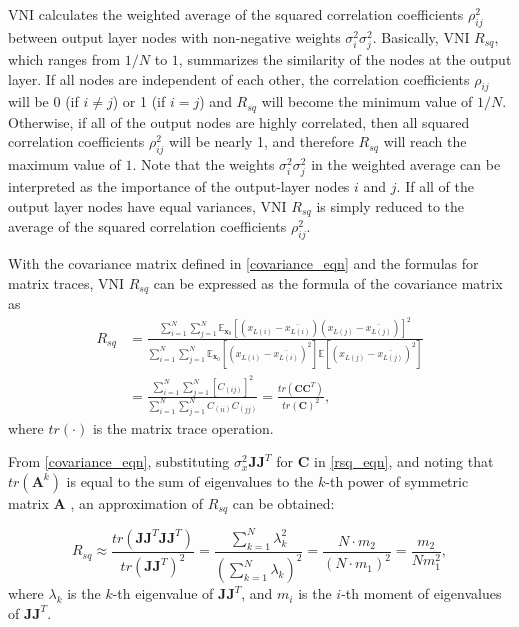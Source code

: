 VNI calculates the weighted average of the squared correlation coefficients $\rho_{ij}^2$ between output layer nodes with non-negative weights $\sigma_i^2\sigma_j^2$. Basically, VNI $R_{sq}$, which ranges from $1/N$ to $1$, summarizes the similarity of the nodes at the output layer. If all nodes are independent of each other, the correlation coefficients $\rho_{ij}$ will be 0 (if $i\neq j$) or 1 (if $i=j$) and $R_{sq}$ will become the minimum value of $1/N$.
Otherwise, if all of the output nodes are highly correlated, then all squared correlation coefficients $\rho_{ij}^2$ will be nearly 1, and therefore $R_{sq}$ will reach the maximum value of $1$.
Note that the weights $\sigma_i^2\sigma_j^2$ in the weighted average can be interpreted as the importance of the output-layer nodes $i$ and $j$. If all of the output layer nodes have equal variances, VNI $R_{sq}$ is simply reduced to the average of the squared correlation coefficients $\rho_{ij}^2$.





With the covariance matrix defined in \eqref{covariance_eqn} and the formulas for matrix traces, VNI $R_{sq}$ can be expressed as the formula of the covariance matrix as
\begin{equation}
    \begin{aligned}
    R_{sq}
    &=\frac{
    \sum_{i=1}^N\sum_{j=1}^N\mathbb{E}_{\mathbf{x}_0}
    [(x_{L(i)}-\overline{x_{L(i)}})(x_{L(j)}-\overline{x_{L(j)}})]^2
    }{
    \sum_{i=1}^N\sum_{j=1}^N
    \mathbb{E}_{\mathbf{x}_0}[(x_{L(i)}-\overline{x_{L(i)}})^2]
    \mathbb{E}[(x_{L(j)}-\overline{x_{L(j)}})^2]
    }\\
    &=
    \frac{\sum_{i=1}^N\sum_{j=1}^N[C_{(ij)}]^2}
    {\sum_{i=1}^N\sum_{j=1}^NC_{(ii)}C_{(jj)}}
    =
    \frac{tr(\mathbf{C}{\mathbf{C}}^T)}
    {tr(\mathbf{C})^2}
    ,
    \end{aligned}
    \label{rsq_eqn}
\end{equation}
where $tr(\cdot)$ is the matrix trace operation.

From \eqref{covariance_eqn}, substituting $\sigma_x^2\mathbf{JJ}^T$ for $\mathbf{C}$ in \eqref{rsq_eqn}, and noting that $tr(\mathbf{A}^k)$ is equal to the sum of eigenvalues to the $k$-th power of symmetric matrix $\mathbf{A}$ \cite{matrix}, an approximation of $R_{sq}$ can be obtained:

\begin{equation}
    R_{sq}\approx
    \frac{tr(\mathbf{JJ}^T\mathbf{JJ}^T)}{tr(\mathbf{JJ}^T)^2}
    =\frac{\sum_{k=1}^N\lambda_k^2}{(\sum_{k=1}^N\lambda_k)^2}
    =\frac{N\cdot m_2}{(N\cdot m_1)^2}
    =\frac{m_2}{Nm_1^2},
    \label{rsq_eigen}
\end{equation}
where $\lambda_k$ is the $k$-th eigenvalue of $\mathbf{JJ}^T$, and $m_i$ is the $i$-th moment of eigenvalues of $\mathbf{JJ}^T$.

